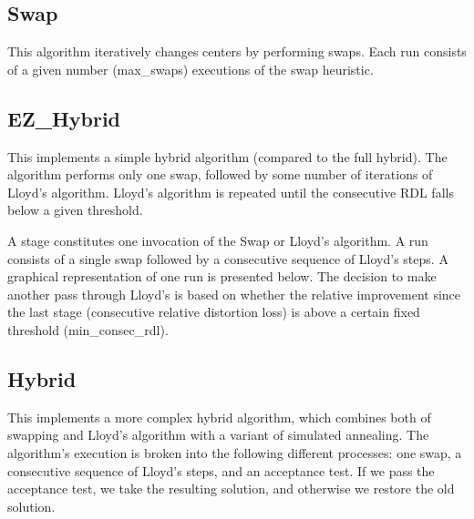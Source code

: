 \documentclass[11pt]{article}		%
\begin{document}
\subsection{Swap}

This algorithm iteratively changes centers by performing swaps.  Each
run consists of a given number (max\_swaps) executions of the swap
heuristic.

\subsection{EZ\_Hybrid}

This implements a simple hybrid algorithm (compared to the full hybrid).
The algorithm performs only one swap, followed by some number of
iterations of Lloyd's algorithm.  Lloyd's algorithm is repeated until
the consecutive RDL falls below a given threshold.

A stage constitutes one invocation of the Swap or Lloyd's algorithm.  A
run consists of a single swap followed by a consecutive sequence of
Lloyd's steps.  A graphical representation of one run is presented
below.  The decision to make another pass through Lloyd's is based on
whether the relative improvement since the last stage (consecutive
relative distortion loss) is above a certain fixed threshold
(min\_consec\_rdl).

\subsection{Hybrid}

This implements a more complex hybrid algorithm, which combines both of
swapping and Lloyd's algorithm with a variant of simulated annealing.
The algorithm's execution is broken into the following different
processes: one swap, a consecutive sequence of Lloyd's steps, and an
acceptance test.  If we pass the acceptance test, we take the resulting
solution, and otherwise we restore the old solution.
\end{document}
